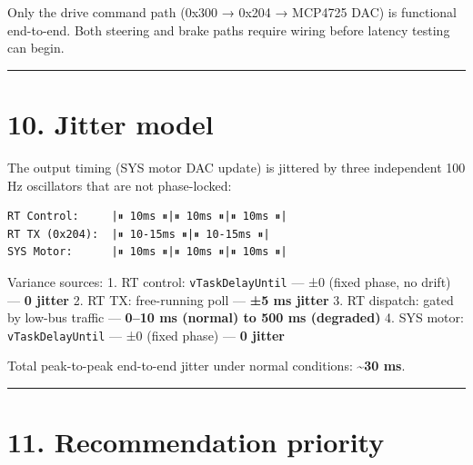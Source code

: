 \documentclass[12pt,a4paper,oneside]{report}
\begin{document}
Only the drive command path (0x300 → 0x204 → MCP4725 DAC) is functional
end-to-end. Both steering and brake paths require wiring before latency testing
can begin.

\begin{center}\rule{0.5\linewidth}{0.5pt}\end{center}

\section{10. Jitter model}\label{jitter-model}

The output timing (SYS motor DAC update) is jittered by three independent 100 Hz
oscillators that are not phase-locked:

\begin{verbatim}
RT Control:     |⏸ 10ms ⏸|⏸ 10ms ⏸|⏸ 10ms ⏸|
RT TX (0x204):  |⏸ 10-15ms ⏸|⏸ 10-15ms ⏸|
SYS Motor:      |⏸ 10ms ⏸|⏸ 10ms ⏸|⏸ 10ms ⏸|
\end{verbatim}

Variance sources: 1. RT control: \texttt{vTaskDelayUntil} --- ±0 (fixed phase,
no drift) --- \textbf{0 jitter} 2. RT TX: free-running poll --- \textbf{±5 ms
jitter} 3. RT dispatch: gated by low-bus traffic --- \textbf{0--10 ms (normal)
to 500 ms (degraded)} 4. SYS motor: \texttt{vTaskDelayUntil} --- ±0 (fixed
phase) --- \textbf{0 jitter}

Total peak-to-peak end-to-end jitter under normal conditions:
\textbf{\textasciitilde30 ms}.

\begin{center}\rule{0.5\linewidth}{0.5pt}\end{center}

\section{11. Recommendation priority}\label{recommendation-priority}
\end{document}
